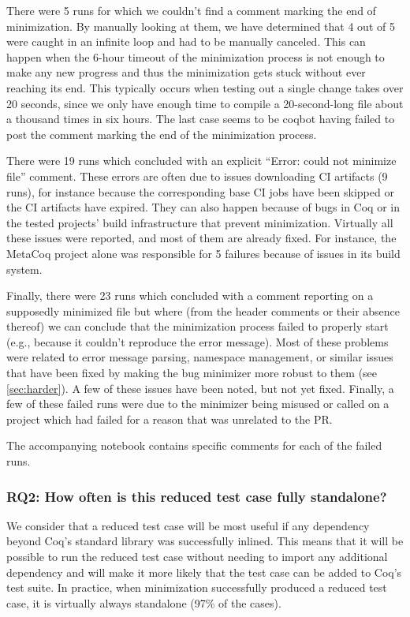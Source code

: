 \documentclass[a4paper,USenglish,cleveref,autoref,thm-restate]{lipics-v2021}
\begin{document}
There were 5 runs for which we couldn't find a comment marking the end of minimization. By manually looking at them, we have determined that 4 out of 5 were caught in an infinite loop and had to be manually canceled. This can happen when the 6-hour timeout of the minimization process is not enough to make any new progress and thus the minimization gets stuck without ever reaching its end. This typically occurs when testing out a single change takes over 20 seconds, since we only have enough time to compile a 20-second-long file about a thousand times in six hours. The last case seems to be coqbot having failed to post the comment marking the end of the minimization process.

There were 19 runs which concluded with an explicit ``Error: could not minimize file'' comment. These errors are often due to issues downloading CI artifacts (9 runs), for instance because the corresponding base CI jobs have been skipped or the CI artifacts have expired. They can also happen because of bugs in Coq or in the tested projects' build infrastructure that prevent minimization. Virtually all these issues were reported, and most of them are already fixed. For instance, the MetaCoq project alone was responsible for 5 failures because of issues in its build system.

Finally, there were 23 runs which concluded with a comment reporting on a supposedly minimized file but where (from the header comments or their absence thereof) we can conclude that the minimization process failed to properly start (e.g., because it couldn't reproduce the error message). Most of these problems were related to error message parsing, namespace management, or similar issues that have been fixed by making the bug minimizer more robust to them (see \autoref{sec:harder}). A few of these issues have been noted, but not yet fixed. Finally, a few of these failed runs were due to the minimizer being misused or called on a project which had failed for a reason that was unrelated to the PR.

The accompanying notebook contains specific comments for each of the failed runs.

\subsubsection{RQ2: How often is this reduced test case fully standalone?}

We consider that a reduced test case will be most useful if any dependency beyond Coq's standard library was successfully inlined. This means that it will be possible to run the reduced test case without needing to import any additional dependency and will make it more likely that the test case can be added to Coq's test suite. In practice, when minimization successfully produced a reduced test case, it is virtually always standalone (97\% of the cases).
\end{document}
